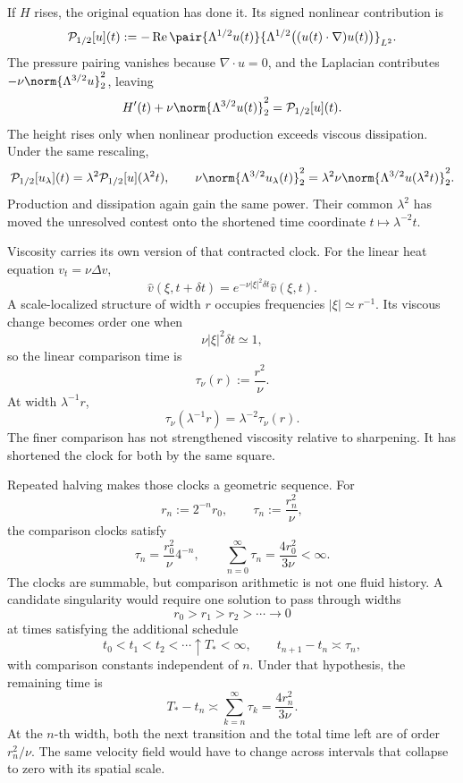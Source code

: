 
If \(H\) rises, the original equation has done it.
Its signed nonlinear contribution is
\[
  \mathcal P_{1/2}[u](t)
  :=
  -\operatorname{Re}
  \pair
    {\Lambda^{1/2}u(t)}
    {\Lambda^{1/2}\bigl((u(t)\cdot\nabla)u(t)\bigr)}_{L^2}.
\]
The pressure pairing vanishes because \(\nabla\cdot u=0\), and the Laplacian contributes \(-\nu\norm{\Lambda^{3/2}u}_2^2\), leaving
\[
  H'(t)
  +
  \nu\norm{\Lambda^{3/2}u(t)}_2^2
  =
  \mathcal P_{1/2}[u](t).
\]
The height rises only when nonlinear production exceeds viscous dissipation.
Under the same rescaling,
\[
  \mathcal P_{1/2}[u_\lambda](t)
  =
  \lambda^2\mathcal P_{1/2}[u](\lambda^2t),
  \qquad
  \nu\norm{\Lambda^{3/2}u_\lambda(t)}_2^2
  =
  \lambda^2\nu\norm{\Lambda^{3/2}u(\lambda^2t)}_2^2.
\]
Production and dissipation again gain the same power.
Their common \(\lambda^2\) has moved the unresolved contest onto the shortened time coordinate \(t\mapsto\lambda^{-2}t\).


Viscosity carries its own version of that contracted clock.
For the linear heat equation \(v_t=\nu\Delta v\),
\[
  \widehat v(\xi,t+\delta t)
  =
  e^{-\nu|\xi|^2\delta t}\widehat v(\xi,t).
\]
A scale-localized structure of width \(r\) occupies frequencies \(|\xi|\simeq r^{-1}\).
Its viscous change becomes order one when
\[
  \nu|\xi|^2\delta t\simeq1,
\]
so the linear comparison time is
\[
  \tau_\nu(r)
  :=
  \frac{r^2}{\nu}.
\]
At width \(\lambda^{-1}r\),
\[
  \tau_\nu(\lambda^{-1}r)
  =
  \lambda^{-2}\tau_\nu(r).
\]
The finer comparison has not strengthened viscosity relative to sharpening.
It has shortened the clock for both by the same square.


Repeated halving makes those clocks a geometric sequence.
For
\[
  r_n:=2^{-n}r_0,
  \qquad
  \tau_n:=\frac{r_n^2}{\nu},
\]
the comparison clocks satisfy
\[
  \tau_n
  =
  \frac{r_0^2}{\nu}4^{-n},
  \qquad
  \sum_{n=0}^{\infty}\tau_n
  =
  \frac{4r_0^2}{3\nu}
  <
  \infty.
\]
The clocks are summable, but comparison arithmetic is not one fluid history.
A candidate singularity would require one \NavierStokes{} solution to pass through widths
\[
  r_0>r_1>r_2>\cdots\longrightarrow0
\]
at times satisfying the additional schedule
\[
  t_0<t_1<t_2<\cdots\uparrow T_*<\infty,
  \qquad
  t_{n+1}-t_n\asymp\tau_n,
\]
with comparison constants independent of \(n\).
Under that hypothesis, the remaining time is
\[
  T_*-t_n
  \asymp
  \sum_{k=n}^{\infty}\tau_k
  =
  \frac{4r_n^2}{3\nu}.
\]
At the \(n\)-th width, both the next transition and the total time left are of order \(r_n^2/\nu\).
The same velocity field would have to change across intervals that collapse to zero with its spatial scale.
